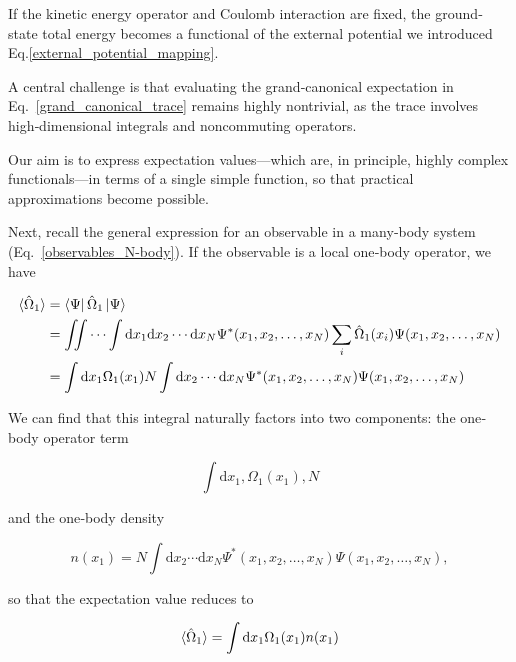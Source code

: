 If the kinetic energy operator and Coulomb interaction are fixed, the ground‐state total energy becomes a functional of the external potential we introduced Eq.\eqref{external_potential_mapping}.

A central challenge is that evaluating the grand‐canonical expectation in Eq.~\eqref{grand_canonical_trace} remains highly nontrivial, as the trace involves high‐dimensional integrals and noncommuting operators.

Our aim is to express expectation values—which are, in principle, highly complex functionals—in terms of a single simple function, so that practical approximations become possible.

Next, recall the general expression for an observable in a many‐body system (Eq.~\eqref{observables_N-body}). If the observable is a local one‐body operator, we have

\begin{equation}
\begin{aligned}
    \braket{\hat\Omega_1}
    &= \bra{\Psi}\hat\Omega_1\ket{\Psi} \\
    &= \iint\cdots\int \mathrm{d}x_1\mathrm{d}x_2\cdots\mathrm{d}x_N\Psi^*(x_1,x_2,\dots,x_N)\sum_{i}\hat\Omega_1(x_i)\Psi(x_1,x_2,\dots,x_N) \\
    &= \int\mathrm{d}x_1\Omega_1(x_1)N\int\mathrm{d}x_2\cdots\mathrm{d}x_N\Psi^*(x_1,x_2,\dots,x_N)\Psi(x_1,x_2,\dots,x_N)
\end{aligned}
\label{observables_one-body}
\end{equation}

We can find that this integral naturally factors into two components: the one‐body operator term

\begin{equation}
\int\mathrm{d}x_1,\Omega_1(x_1),N
\label{one-body_operator}
\end{equation}

and the one‐body density

\begin{equation}
n(x_1)=N\int\mathrm{d}x_2\cdots\mathrm{d}x_N\Psi^*(x_1,x_2,\dots,x_N)\Psi(x_1,x_2,\dots,x_N),
\label{one-body_density}
\end{equation}

so that the expectation value reduces to

\begin{equation}
\braket{\hat\Omega_1}=\int\mathrm{d}x_1\Omega_1(x_1)n(x_1)
\label{observables_one-body_density}
\end{equation}

